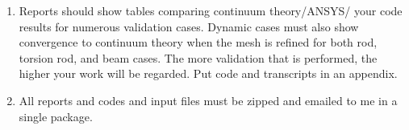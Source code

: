 \documentclass[11pt]{article}
\begin{document}
\begin{enumerate}
\item Reports should show tables comparing continuum theory/{}ANSYS/ your code results for numerous validation cases. Dynamic cases must also show convergence to continuum theory when the mesh is refined for both rod, torsion rod, and beam cases. The more validation that is performed, the higher your work will be regarded. Put code and transcripts in an appendix.

\item All reports and codes and input files must be zipped and emailed to me in a single package. 

\end{enumerate}

\end{document}
